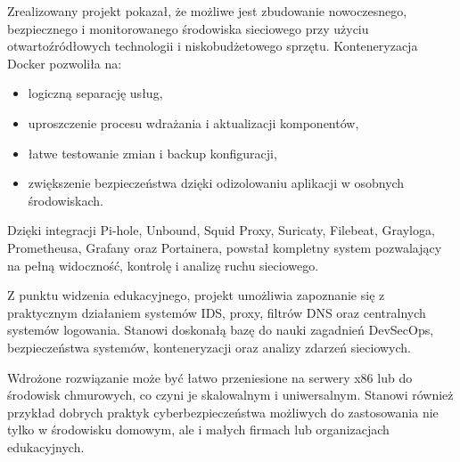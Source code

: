 \documentclass[
    left=2.5cm,         %
    right=2.5cm,        %
    top=2.5cm,          %
    bottom=3cm,         %
    bindingoffset=6mm,  %
    nohyphenation=true %
]{eiti/eiti-thesis} %
\begin{document}
Zrealizowany projekt pokazał, że możliwe jest zbudowanie nowoczesnego, bezpiecznego i monitorowanego środowiska sieciowego przy użyciu otwartoźródłowych technologii i niskobudżetowego sprzętu. Konteneryzacja Docker pozwoliła na:
\begin{itemize}
    \item logiczną separację usług,
    \item uproszczenie procesu wdrażania i aktualizacji komponentów,
    \item łatwe testowanie zmian i backup konfiguracji,
    \item zwiększenie bezpieczeństwa dzięki odizolowaniu aplikacji w osobnych środowiskach.
\end{itemize}

Dzięki integracji Pi-hole, Unbound, Squid Proxy, Suricaty, Filebeat, Grayloga, Prometheusa, Grafany oraz Portainera, powstał kompletny system pozwalający na pełną widoczność, kontrolę i analizę ruchu sieciowego.

Z punktu widzenia edukacyjnego, projekt umożliwia zapoznanie się z praktycznym działaniem systemów IDS, proxy, filtrów DNS oraz centralnych systemów logowania. Stanowi doskonałą bazę do nauki zagadnień DevSecOps, bezpieczeństwa systemów, konteneryzacji oraz analizy zdarzeń sieciowych.

Wdrożone rozwiązanie może być łatwo przeniesione na serwery x86 lub do środowisk chmurowych, co czyni je skalowalnym i uniwersalnym. Stanowi również przykład dobrych praktyk cyberbezpieczeństwa możliwych do zastosowania nie tylko w środowisku domowym, ale i małych firmach lub organizacjach edukacyjnych.

\newpage

\end{document}
